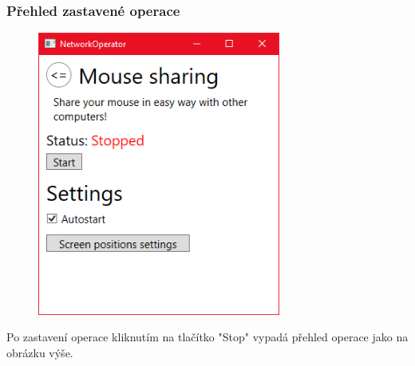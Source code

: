 \documentclass[12pt]{article}
\begin{document}
\subsubsection{Přehled zastavené operace}
\begin{figure}[H]
\includegraphics[width=8cm]{stopped-operation-overview.png}
\centering
\end{figure}

Po zastavení operace kliknutím na tlačítko "Stop" vypadá přehled operace jako na obrázku výše.
\end{document}
